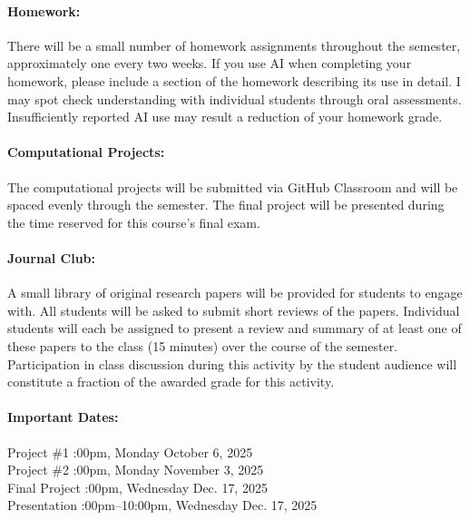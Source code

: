 \documentclass[11pt, a4paper]{article}
\begin{document}
\paragraph{Homework:} There will be a small number of homework assignments
throughout the semester, approximately one every two weeks. If you use AI when 
completing your homework, please include a section of the homework describing 
its use in detail. I may spot check understanding with individual students 
through oral assessments. Insufficiently reported AI use may result a reduction 
of your homework grade.

\paragraph{Computational Projects:} The computational projects will be
submitted via GitHub Classroom and will be spaced evenly through the semester.
The final project will be presented during the time reserved for this course's
final exam.

\paragraph{Journal Club:} A small library of original research papers will be
provided for students to engage with. All students will be asked to submit
short reviews of the papers. Individual students will each be assigned to
present a review and summary of at least one of these papers to the class (15
minutes) over the course of the semester.  Participation in class discussion
during this activity by the student audience will constitute a fraction of the
awarded grade for this activity.


\paragraph{Important Dates:}
\begin{center} \begin{minipage}{3.8in}
\begin{flushleft}
Project \#1      :00pm, Monday October 6, 2025 \\
Project \#2      :00pm, Monday November 3, 2025\\
Final Project    :00pm, Wednesday Dec. 17, 2025\\
Presentation :00pm--10:00pm, Wednesday Dec. 17, 2025\\
\end{flushleft}
\end{minipage}
\end{center}
\end{document}
